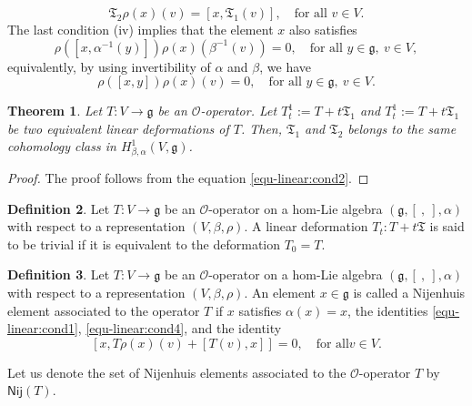 \documentclass[a4paper,11pt]{amsart}
\theoremstyle{plain}
\newtheorem{theorem}{Theorem}[section]
\theoremstyle{definition}
\newtheorem{definition}[theorem]{Definition}
\theoremstyle{remark}
\numberwithin{equation}{section}
\begin{document}
\begin{equation}\label{equ-linear:cond3}
\mathfrak{T}_2\rho(x)(v)=[x,\mathfrak{T}_1(v)],\quad\mbox{for all }v\in V.
\end{equation}
The last condition (iv) implies that the element $x$ also satisfies
$$\rho([x,\alpha^{-1}(y)])\rho(x)(\beta^{-1}(v))=0, \quad\mbox{for all } y\in \mathfrak{g}, ~v\in V,$$
equivalently, by using invertibility of $\alpha$ and $\beta$, we have
\begin{equation}\label{equ-linear:cond4}
\rho([x,y])\rho(x)(v)=0, \quad\mbox{for all } y\in \mathfrak{g}, ~v\in V.
\end{equation}
\begin{theorem}
Let $T:V\rightarrow \mathfrak{g}$ be an $\mathcal{O}$-operator. Let $T_t^1:=T+t\mathfrak{T}_1$ and $T_t^1:=T+t\mathfrak{T}_1$ be two equivalent linear deformations of $T$. Then, $\mathfrak{T}_1$ and $\mathfrak{T}_2$ belongs to the same cohomology class in $H^1_{\beta,\alpha}(V,\mathfrak{g})$.
\end{theorem}
\begin{proof}
The proof follows from the equation \eqref{equ-linear:cond2}.
\end{proof}
 
\begin{definition}
Let $T: V\rightarrow \mathfrak{g}$ be an $\mathcal{O}$-operator on a hom-Lie algebra $(\mathfrak{g},[~,~],\alpha)$ with respect to a representation $(V,\beta,\rho)$. A linear deformation $T_t:T+t\mathfrak{T}$ is said to be trivial if it is equivalent to the deformation $T_0=T$.
\end{definition}

\begin{definition}
 Let $T: V\rightarrow \mathfrak{g}$ be an $\mathcal{O}$-operator on a hom-Lie algebra $(\mathfrak{g},[~,~],\alpha)$ with respect to a representation $(V,\beta,\rho)$. An element $x\in \mathfrak{g}$ is called a Nijenhuis element associated to the operator $T$ if $x$ satisfies $\alpha(x)=x$, the identities \eqref{equ-linear:cond1}, \eqref{equ-linear:cond4}, and the identity
$$[x,T\rho(x)(v)+[T(v),x]]=0,\quad \mbox{for all} v\in V.$$ 
\end{definition}
Let us denote the set of Nijenhuis elements associated to the $\mathcal{O}$-operator $T$ by $\mathsf{Nij}(T)$.
\end{document}
